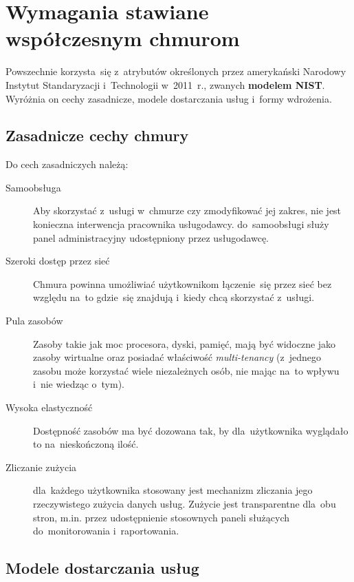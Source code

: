 \documentclass[12pt,a4paper,twoside,titlepage,openright]{book}
\begin{document}
\section{Wymagania stawiane współczesnym chmurom}

Powszechnie korzysta~się z~atrybutów określonych przez amerykański Narodowy Instytut Standaryzacji i~Technologii w~2011~r., zwanych \textbf{modelem NIST}. Wyróżnia on cechy zasadnicze, modele dostarczania usług i~formy wdrożenia. \cite{ccCambridge, azurePackt, nistArticle}

\subsection{Zasadnicze cechy chmury}

Do cech zasadniczych należą:

\begin{description}
\item [Samoobsługa] Aby skorzystać z~usługi w~chmurze czy zmodyfikować jej zakres, nie jest konieczna interwencja pracownika usługodawcy. do~samoobsługi służy panel administracyjny udostępniony przez usługodawcę.
\item [Szeroki dostęp przez sieć] Chmura powinna umożliwiać użytkownikom łączenie~się przez sieć bez względu na~to gdzie~się znajdują i~kiedy chcą skorzystać z~usługi.
\item [Pula zasobów] Zasoby takie jak moc procesora, dyski, pamięć, mają być widoczne jako zasoby wirtualne oraz posiadać właściwość \textit{multi-tenancy} (z~jednego zasobu może korzystać wiele niezależnych osób, nie mając na~to wpływu i~nie wiedząc o~tym).
\item [Wysoka elastyczność] Dostępność zasobów ma być dozowana tak, by dla~użytkownika wyglądało to na~nieskończoną ilość.
\item [Zliczanie zużycia] dla~każdego użytkownika stosowany jest mechanizm zliczania jego rzeczywistego zużycia danych usług. Zużycie jest transparentne dla~obu stron, m.in. przez udostępnienie stosownych paneli służących do~monitorowania i~raportowania.
\end{description}

\subsection{Modele dostarczania usług}
\end{document}
